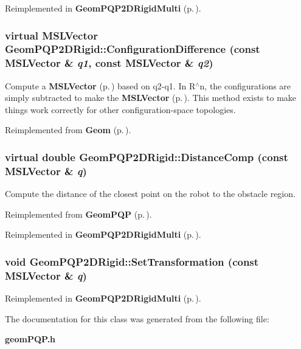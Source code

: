 Reimplemented in {\bf Geom\-PQP2DRigid\-Multi} {\rm (p.\,\pageref{class_GeomPQP2DRigidMulti_a2})}.
\subsubsection{\setlength{\rightskip}{0pt plus 5cm}virtual {\bf MSLVector} Geom\-PQP2DRigid::Configuration\-Difference (const {\bf MSLVector} \& {\em q1}, const {\bf MSLVector} \& {\em q2})\hspace{0.3cm}{\tt  [virtual]}}\label{class_GeomPQP2DRigid_a4}


Compute a {\bf MSLVector} {\rm (p.\,\pageref{class_MSLVector})} based on q2-q1. In R$^\wedge$n, the configurations are simply subtracted to make the {\bf MSLVector} {\rm (p.\,\pageref{class_MSLVector})}. This method exists to make things work correctly for other configuration-space topologies.



Reimplemented from {\bf Geom} {\rm (p.\,\pageref{class_Geom_a4})}.
\subsubsection{\setlength{\rightskip}{0pt plus 5cm}virtual double Geom\-PQP2DRigid::Distance\-Comp (const {\bf MSLVector} \& {\em q})\hspace{0.3cm}{\tt  [virtual]}}\label{class_GeomPQP2DRigid_a3}


Compute the distance of the closest point on the robot to the obstacle region.



Reimplemented from {\bf Geom\-PQP} {\rm (p.\,\pageref{class_GeomPQP_a5})}.

Reimplemented in {\bf Geom\-PQP2DRigid\-Multi} {\rm (p.\,\pageref{class_GeomPQP2DRigidMulti_a3})}.
\subsubsection{\setlength{\rightskip}{0pt plus 5cm}void Geom\-PQP2DRigid::Set\-Transformation (const {\bf MSLVector} \& {\em q})}\label{class_GeomPQP2DRigid_a5}




Reimplemented in {\bf Geom\-PQP2DRigid\-Multi} {\rm (p.\,\pageref{class_GeomPQP2DRigidMulti_a5})}.

The documentation for this class was generated from the following file:\begin{CompactItemize}
\item 
{\bf geom\-PQP.h}\end{CompactItemize}
